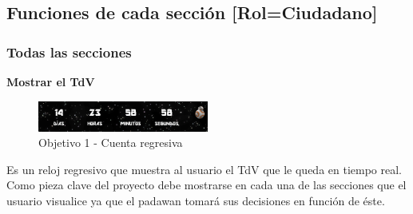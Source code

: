 \newpage

\subsection{Funciones de cada sección [Rol=Ciudadano]}

\subsubsection{Todas las secciones}

\textbf{Mostrar el TdV}
\begin{figure}[ht]
	\centering
	\includegraphics[width=0.5\textwidth]{imagenes/Objetivo1_new.png}
	\caption{Objetivo 1 - Cuenta regresiva}
	\label{objetivoIm1}
\end{figure}

Es un reloj regresivo que muestra al usuario el TdV que le queda en tiempo real. Como pieza clave del proyecto debe mostrarse en cada una de las secciones que el usuario visualice ya que el padawan tomará sus decisiones en función de éste.\\


